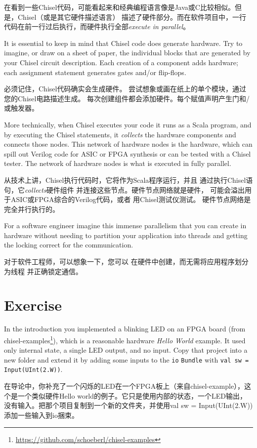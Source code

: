 \documentclass[%
    10pt,
    headinclude, footexclude,
    openright, %
    notitlepage,
    cleardoubleempty,
    headsepline,
    pointlessnumbers,
    bibtotoc, idxtotoc,
    ]{scrbook}
\newcommand{\code}[1]{{\small{\texttt{#1}}}}
\newcommand{\myref}[2]{\href{#1}{#2}}
\renewcommand{\myref}[2]{{#2}{\footnote{\url{#1}}}}
\begin{document}
在看到一些Chisel代码，可能看起来和经典编程语言像是Java或C比较相似。但是，Chisel（或是其它硬件描述语言）
描述了硬件部分。而在软件项目中，一行代码在前一行过后执行，而硬件执行全部\emph{execute in parallel}。

It is essential to keep in mind that Chisel code does generate hardware.
Try to imagine, or draw on a sheet of paper, the individual blocks that
are generated by your Chisel circuit description.
Each creation of a component adds hardware; each assignment statement
generates gates and/or flip-flops.

必须记住，Chisel代码确实会生成硬件。
尝试想象或画在纸上的单个模块，通过您的Chisel电路描述生成。
每次创建组件都会添加硬件。每个赋值声明产生门和/或触发器。

More technically, when Chisel executes your code it runs as a Scala program, and
by executing the Chisel statements, it \emph{collects} the hardware components
and connects those nodes. This network of hardware nodes is the hardware,
which can spill out Verilog code for ASIC or FPGA synthesis or can be
tested with a Chisel tester.
The network of hardware nodes is what is executed in fully parallel.


从技术上讲，Chisel执行代码时，它将作为Scala程序运行，并且
通过执行Chisel语句，它\emph{collects}硬件组件
并连接这些节点。硬件节点网络就是硬件，
可能会溢出用于ASIC或FPGA综合的Verilog代码，或者
用Chisel测试仪测试。
硬件节点网络是完全并行执行的。

For a software engineer imagine this immense parallelism that you can
create in hardware without needing to partition your application into threads
and getting the locking correct for the communication.


对于软件工程师，可以想象一下，您可以
在硬件中创建，而无需将应用程序划分为线程
并正确锁定通信。

\section{Exercise}

In the introduction you implemented a blinking LED on an FPGA board
(from \myref{https://github.com/schoeberl/chisel-examples}{chisel-examples}), which is a reasonable
hardware \emph{Hello World} example. It used only internal state, a single LED output, and no input.
Copy that project into a new folder and extend it by adding some inputs to the \code{io} \code{Bundle}
with \code{val sw = Input(UInt(2.W))}.

在导论中，你补充了一个闪烁的LED在一个FPGA板上（来自chisel-example），这个是一个类似硬件Hello world的例子。它只是使用内部的状态，一个LED输出，没有输入。把那个项目复制到一个新的文件夹，并使用val sw = Input(UInt(2.W))添加一些输入到io捆束。
\end{document}
